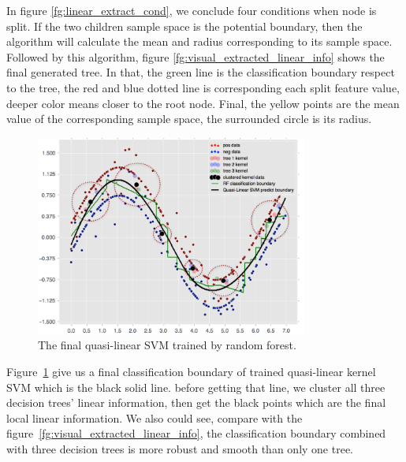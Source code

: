 \documentclass[master]{IPSstyle}
\begin{document}
{In figure \ref{fg:linear_extract_cond}, we conclude four conditions when node is split. If the two children sample space is the potential boundary, then the algorithm will calculate the mean and radius corresponding to its sample space.
Followed by this algorithm, figure \ref{fg:visual_extracted_linear_info} shows the final generated tree. In that, the green line is the classification boundary respect to the tree, the red and blue dotted line is corresponding each split feature value, deeper color means closer to the root node. Final, the yellow points are the mean value of the corresponding sample space, the surrounded circle is its radius.
\begin{figure}[H]
    \centering
    \includegraphics[width=0.8\textwidth]{figures/ch3_QLSVM_byRF.png}
    \caption{The final quasi-linear SVM trained by random forest. }
    \label{fg:QLSVM_byRF}
\end{figure}
Figure~\ref{fg:QLSVM_byRF} give us a final classification boundary of trained quasi-linear kernel SVM which is the black solid line. before getting that line, we cluster all three decision trees' linear information, then get the black points which are the final local linear information. We also could see, compare with the figure~\ref{fg:visual_extracted_linear_info}, the classification boundary combined with three decision trees is more robust and smooth than only one tree.

}
\end{document}
